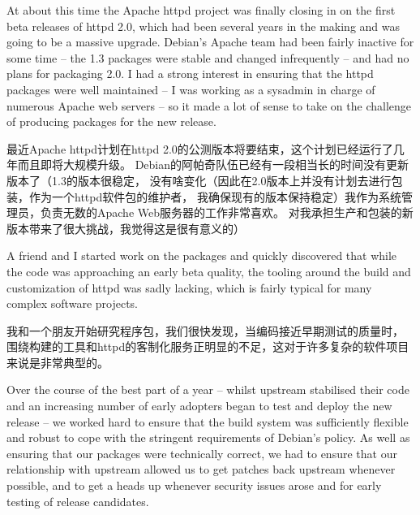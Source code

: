 At about this time the Apache httpd project was finally closing in on the first
beta releases of httpd 2.0, which had been several years in the making and was
going to be a massive upgrade. Debian's Apache team had been fairly inactive for
some time -- the 1.3 packages were stable and changed infrequently -- and had no
plans for packaging 2.0. 
I had a strong interest in ensuring that the httpd packages were well maintained
-- I was working as a sysadmin in charge of numerous Apache web servers -- so it
made a lot of sense to take on the challenge of producing packages for the new
release. 

最近Apache httpd计划在httpd 2.0的公测版本将要结束，这个计划已经运行了几年而且即将大规模升级。
Debian的阿帕奇队伍已经有一段相当长的时间没有更新版本了（1.3的版本很稳定，
没有啥变化（因此在2.0版本上并没有计划去进行包装，作为一个httpd软件包的维护者，
我确保现有的版本保持稳定）我作为系统管理员，负责无数的Apache Web服务器的工作非常喜欢。
对我承担生产和包装的新版本带来了很大挑战，我觉得这是很有意义的）

A friend and I started work on the packages and quickly discovered that while
the code was approaching an early beta quality, the tooling around the build and
customization of httpd was sadly lacking, which is fairly typical for many
complex software projects. 

我和一个朋友开始研究程序包，我们很快发现，当编码接近早期测试的质量时，
围绕构建的工具和httpd的客制化服务正明显的不足，这对于许多复杂的软件项目来说是非常典型的。

Over the course of the best part of a year -- whilst upstream stabilised their
code and an increasing number of early adopters began to test and deploy the new
release -- we worked hard to ensure that the build system was sufficiently
flexible and robust to cope with the stringent requirements of Debian's policy.
As well as ensuring that our packages were technically correct, we had to ensure
that our relationship with upstream allowed us to get patches back upstream
whenever possible, and to get a heads up whenever security issues arose and for
early testing of release candidates. 

